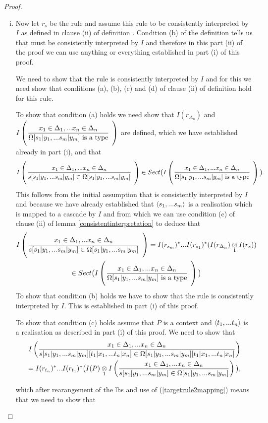 \begin{proof}
\begin{enumerate}[(i)]
\item 
\newcommand{\targetruletwo}{\gatdisplayrule{\xDelta{n}}{\ofT{s[\SUBsFORy{m}]}{\Omega[\SUBsFORy{m}]}}}
Now let $r_s$ be the rule \ZsOmega and assume this rule to be consistently interpreted by $I$ as defined
in clause (ii) of definition . Condition (b) of the definition tells us that
\targetruleone must be consistently interpreted by $I$ and therefore in this part (ii) of the proof we can use
anything or everything established in part (i) of this proof.

We need to show that the rule \ZsOmegaSUBsmFORym is consistently interpreted by $I$ and for this we need show that conditions (a), (b), (c) and (d)
of clause (ii) of definition  hold for this rule.

To show that condition (a) holds we need show that $I(r_{\Delta_n})$ and $\Imap{\targetruleone}$ are defined, which we have established already in part (i),
and that $$\Imap{\targetruletwo} \in Sect\big(\Imap{\targetruleone}\big).$$
This follows from the initial assumption that \ZsOmega is consistently interpreted by $I$ 
and because we have already established that $\tuple{\sm}$ is a realisation which is mapped to a cascade by $I$
and from which we can use condition (c) of clause (ii) of lemma \ref{consistentinterpretation} to deduce that
\begin{multline}
\label{targetrule2mapping}
\Imap{\targetruletwo} = I(r_{s_m})^*...I(r_{s_1})^*(\crossx{I(r_{\Delta_n})}{I(r_s)}{1})\\
                      \in Sect\big(\Imap{\targetruleone}\big)
\end{multline}
To show that condition (b) holds we have to show that the rule \targetruleone is consistently interpreted by $I$. 
This is established in part (i) of this proof.

To show that condition (c) holds assume that $P$ is a context and $\tuple{\tn}$ is a realisation as described in part (i) of this proof.
We need to show that 
\begin{multline}
\Imappedrule{\xDelta{n}}{\ofT{s[\SUBsFORy{m}][\SUBtFORx{n}]}{\Omega[\SUBsFORy{m}][\SUBtFORx{n}]}} \\
                =I(r_{t_n})^* ... I(r_{t_1})^*\big(\crossx{I(P)}{\Imappedrule{\xDelta{n}}{\ofT{s[\SUBsFORy{m}]}{\Omega[\SUBsFORy{m}]}}}{1}\big),
\end{multline}

which after rearangement of the lhs and use of (\ref{targetrule2mapping}) means that we need to show that


\end{enumerate}
\end{proof}
